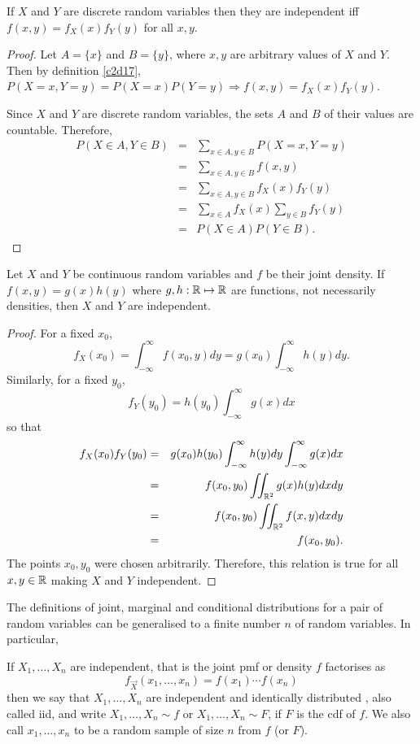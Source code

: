 \documentclass{article}
\begin{document}
\begin{prop}\label{c2p6}
If $X$ and $Y$ are discrete random variables then they are independent iff
$f(x, y) = f_X(x)f_Y(y)$ for all $x, y$.
\end{prop}
\begin{proof}
Let $A = \{x\}$ and $B = \{y\}$, where $x, y$ are arbitrary values of $X$ and
$Y$. Then by definition \ref{c2d17}, $P(X=x, Y=y) = P(X=x)P(Y=y) \Rightarrow
f(x, y) = f_X(x)f_Y(y)$.

Since $X$ and $Y$ are discrete random variables, the sets $A$ and $B$ of their
values are countable. Therefore,
\begin{eqnarray*}
P(X \in A, Y \in B) &=& \sum_{x \in A, y \in B}P(X = x, Y = y) \\
 &=& \sum_{x \in A, y \in B}f(x, y) \\
 &=& \sum_{x\in A, y \in B}f_X(x)f_Y(y) \\
 &=& \sum_{x \in A}f_X(x)\sum_{y \in B}f_Y(y) \\
 &=& P(X \in A)P(Y \in B).
\end{eqnarray*}
\end{proof}

\begin{prop}\label{c2p7}
Let $X$ and $Y$ be continuous random variables and $f$ be their joint density.
If $f(x, y) = g(x)h(y)$ where $g, h: \mathbb{R} \mapsto \mathbb{R}$ are functions, not
necessarily densities, then $X$ and $Y$ are independent.
\end{prop}
\begin{proof}
For a fixed $x_0$,
\[
f_X(x_0) = \int_{-\infty}^\infty f(x_0, y)dy = g(x_0)\int_{-\infty}^\infty h(y)dy.
\]
Similarly, for a fixed $y_0$,
\[
f_Y(y_0) = h(y_0)\int_{-\infty}^\infty g(x)dx
\]
so that
\begin{eqnarray*}
f_X(x_0)f_Y(y_0) &=& 
	g(x_0)h(y_0)\int_{-\infty}^\infty h(y)dy\int_{-\infty}^\infty g(x)dx \\
 &=& f(x_0, y_0)\iint_{\mathbb{R}^2}g(x)h(y)dxdy \\
 &=& f(x_0, y_0)\iint_{\mathbb{R}^2}f(x, y)dxdy \\
 &=& f(x_0, y_0).
\end{eqnarray*}
The points $x_0, y_0$ were chosen arbitrarily. Therefore, this relation is true
for all $x, y \in \mathbb{R}$ making $X$ and $Y$ independent.
\end{proof}

The definitions of joint, marginal and conditional distributions for a pair of
random variables can be generalised to a finite number $n$ of random variables.
In particular,
\begin{defn}\label{c2d18}
If $X_1, \ldots, X_n$ are independent, that is the joint pmf or density $f$ 
factorises as
\[
f_{\vec{X}}(x_1, \ldots, x_n) = f(x_1)\cdots f(x_n)
\]
then we say that $X_1, \ldots, X_n$ are independent and identically distributed
, also called iid, and write $X_1, \ldots, X_n \sim f$ or $X_1, \ldots, X_n \sim
F$, if $F$ is the cdf of $f$. We also call $x_1, \ldots, x_n$ to be a random 
sample of size $n$ from $f$ (or $F$).
\end{defn}
\end{document}
